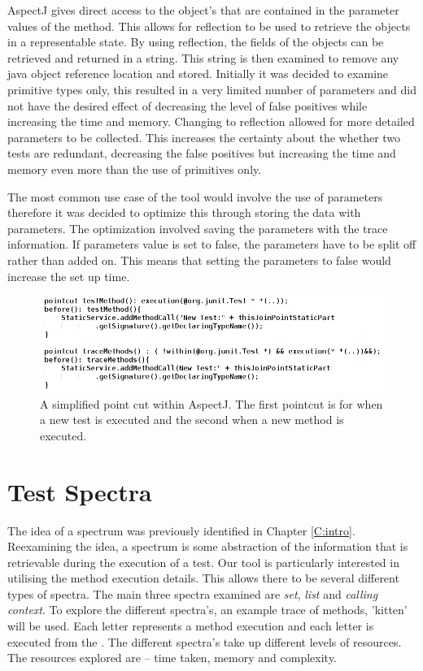 AspectJ gives direct access to the object's that are contained in the parameter values of the method. This allows for reflection to be used to retrieve the objects in a representable state. By using reflection, the fields of the objects can be retrieved and returned in a string. This string is then examined to remove any java object reference location and stored. Initially it was decided to examine primitive types only, this resulted in a very limited number of parameters and did not have the desired effect of decreasing the level of false positives while increasing the time and memory. Changing to reflection allowed for more detailed parameters to be collected. This increases the certainty about the whether two tests are redundant, decreasing the false positives but increasing the time and memory even more than the use of primitives only. 

The most common use case of the tool would involve the use of parameters therefore it was decided to optimize this through storing the data with parameters. The optimization involved saving the parameters with the trace information. If parameters value is set to false, the parameters have to be split off rather than added on. This means that setting the parameters to false would increase the set up time.

\begin{figure}[h]
\begin{center}
\includegraphics[width = \textwidth]{aspect.png}
\end{center}
\caption{A simplified point cut within AspectJ. The first pointcut is for when a new test is executed and the second when a new method is executed.}
\label{fig:aspectused}
\end{figure}

\section{Test Spectra}
\label{S:spectra}
The idea of a spectrum was previously identified in Chapter \ref{C:intro}. Reexamining the idea, a spectrum is some abstraction of the information that is retrievable during the execution of a test. Our tool is particularly interested in utilising the method execution details. This allows there to be several different types of spectra. The main three spectra examined are \textit{set}, \textit{list} and \textit{calling context}. To explore the different spectra's, an example trace of methods, 'kitten' will be used. Each letter represents a method execution and each letter is executed from the . The different spectra's take up different levels of resources. The resources explored are -- time taken, memory and complexity. 

